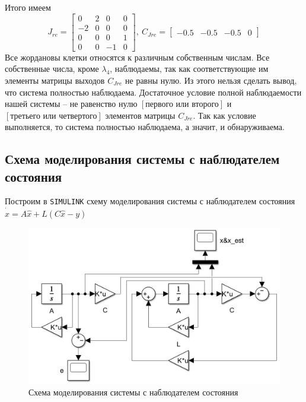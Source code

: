 \documentclass[a4paper, 12pt]{article}
\begin{document}
    Итого имеем
    $$
    J_{re}=\begin{bmatrix}
        0    &2   &0    &0\\
       -2   &0    &0   &0\\
        0   &0    &0    &1\\
       0   &0   &-1   &0
    \end{bmatrix},\ C_{Jre}=\begin{bmatrix}
        -0.5   &-0.5   &-0.5         &0
    \end{bmatrix}
    $$
    Все жордановы клетки относятся к различным собственным числам. Все собственные числа, кроме
    $\lambda_4$, наблюдаемы, так как соответствующие им элементы матрицы выходов $C_{Jre}$
    не равны нулю. Из этого нельзя сделать вывод, что система полностью наблюдаема. Достаточное
    условие полной наблюдаемости нашей системы -- не равенство нулю $\left[\text{первого или второго}\right]$
    и $\left[\text{третьего или четвертого}\right]$ элементов матрицы $C_{Jre}$. Так как условие
    выполняется, то система полностью наблюдаема, а значит, и обнаруживаема.


    \subsection{Схема моделирования системы с наблюдателем состояния}
    Построим в \texttt{SIMULINK} схему моделирования системы с наблюдателем состояния
    $\dot{\hat{x}}=A\hat{x}+L\left(C\hat{x}-y\right)$
    \begin{figure}[H]
        \centering
        \includegraphics[scale=0.5]{scheme_task2.png}
        \captionsetup{skip=0pt}
        \caption{Схема моделирования системы с наблюдателем состояния}
        \label{fig:scheme_task2}
    \end{figure}
\end{document}
